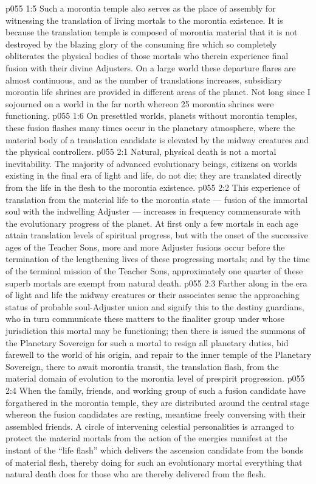 \vs p055 1:5 Such a morontia temple also serves as the place of assembly for witnessing the translation of living mortals to the morontia existence. It is because the translation temple is composed of morontia material that it is not destroyed by the blazing glory of the consuming fire which so completely obliterates the physical bodies of those mortals who therein experience final fusion with their divine Adjusters. On a large world these departure flares are almost continuous, and as the number of translations increases, subsidiary morontia life shrines are provided in different areas of the planet. Not long since I sojourned on a world in the far north whereon 25 morontia shrines were functioning.
\vs p055 1:6 \pc On presettled worlds, planets without morontia temples, these fusion flashes many times occur in the planetary atmosphere, where the material body of a translation candidate is elevated by the midway creatures and the physical controllers.
\vs p055 2:1 Natural, physical death is not a mortal inevitability. The majority of advanced evolutionary beings, citizens on worlds existing in the final era of light and life, do not die; they are translated directly from the life in the flesh to the morontia existence.
\vs p055 2:2 This experience of translation from the material life to the morontia state --- fusion of the immortal soul with the indwelling Adjuster --- increases in frequency commensurate with the evolutionary progress of the planet. At first only a few mortals in each age attain translation levels of spiritual progress, but with the onset of the successive ages of the Teacher Sons, more and more Adjuster fusions occur before the termination of the lengthening lives of these progressing mortals; and by the time of the terminal mission of the Teacher Sons, approximately one quarter of these superb mortals are exempt from natural death.
\vs p055 2:3 \pc Farther along in the era of light and life the midway creatures or their associates sense the approaching status of probable soul\hyp{}Adjuster union and signify this to the destiny guardians, who in turn communicate these matters to the finaliter group under whose jurisdiction this mortal may be functioning; then there is issued the summons of the Planetary Sovereign for such a mortal to resign all planetary duties, bid farewell to the world of his origin, and repair to the inner temple of the Planetary Sovereign, there to await morontia transit, the translation flash, from the material domain of evolution to the morontia level of prespirit progression.
\vs p055 2:4 \pc When the family, friends, and working group of such a fusion candidate have forgathered in the morontia temple, they are distributed around the central stage whereon the fusion candidates are resting, meantime freely conversing with their assembled friends. A circle of intervening celestial personalities is arranged to protect the material mortals from the action of the energies manifest at the instant of the “life flash” which delivers the ascension candidate from the bonds of material flesh, thereby doing for such an evolutionary mortal everything that natural death does for those who are thereby delivered from the flesh.
